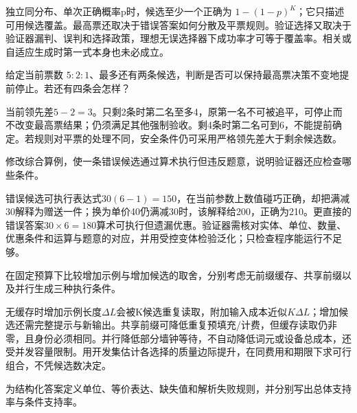 \begin{exercises}
\begin{exercise}
\begin{solution}
独立同分布、单次正确概率p时，候选至少一个正确为 $1-(1-p)^K$；它只描述可用候选覆盖。最高票还取决于错误答案如何分散及平票规则。验证选择又取决于验证器漏判、误判和选择政策，理想无误选择器下成功率才可等于覆盖率。相关或自适应生成时第一式本身也未必成立。
\end{solution}
\end{exercise}

\begin{exercise} 给定当前票数 $5:2:1$、最多还有两条候选，判断是否可以保持最高票决策不变地提前停止。若还有四条会怎样？

\begin{solution}
当前领先差$5-2=3$。只剩2条时第二名至多4，原第一名不可被追平，可停止而不改变最高票结果；仍须满足其他强制验收。剩4条时第二名可到6，不能提前确定。若规则对平票的处理不同，安全条件仍可采用严格领先差大于剩余候选数。
\end{solution}
\end{exercise}

\begin{exercise} 修改综合算例，使一条错误候选通过算术执行但违反题意，说明验证器还应检查哪些条件。

\begin{solution}
错误候选可执行表达式$30(6-1)=150$，在当前参数上数值碰巧正确，却把满减30解释为赠送一件；换为单价40仍满减30时，该解释给200，正确为210。更直接的错误答案$30\times6=180$算术可执行但遗漏优惠。验证器需核对实体、单位、数量、优惠条件和运算与题意的对应，并用受控变体检验泛化；只检查程序能运行不足够。
\end{solution}
\end{exercise}

\begin{exercise}\optional 在固定预算下比较增加示例与增加候选的取舍，分别考虑无前缀缓存、共享前缀以及并行生成三种执行条件。

\begin{solution}
无缓存时增加示例长度$\Delta L$会被K候选重复读取，附加输入成本近似$K\Delta L$；增加候选还需完整提示与新输出。共享前缀可降低重复预填充/计费，但缓存读取仍非零，且身份必须相同。并行降低部分墙钟等待，不自动降低词元或设备总成本，还受并发容量限制。用开发集估计各选择的质量边际提升，在同费用和期限下求可行组合，不凭候选数决定。
\end{solution}
\end{exercise}

\begin{exercise} 为结构化答案定义单位、等价表达、缺失值和解析失败规则，并分别写出总体支持率与条件支持率。


\end{exercise}
\end{exercises}
